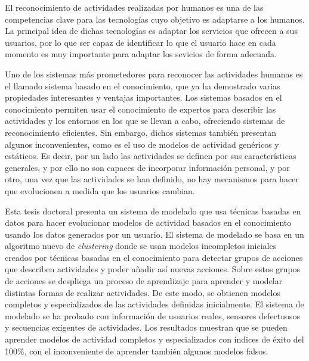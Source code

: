 \begin{resumen}        %


El reconocimiento de actividades realizadas por humanos es una de las competencias clave para las tecnologías cuyo objetivo es adaptarse a los humanos. La principal idea de dichas tecnologías es adaptar los servicios que ofrecen a sus usuarios, por lo que ser capaz de identificar lo que el usuario hace en cada momento es muy importante para adaptar los sevicios de forma adecuada.

Uno de los sistemas más prometedores para reconocer las actividades humanas es el llamado sistema basado en el conocimiento, que ya ha demostrado varias propiedades interesantes y ventajas importantes. Los sistemas basados en el conocimiento permiten usar el conocimiento de expertos para describir las actividades y los entornos en los que se llevan a cabo, ofreciendo sistemas de reconocimiento eficientes. Sin embargo, dichos sistemas también presentan algunos inconvenientes, como es el uso de modelos de actividad genéricos y estáticos. Es decir, por un lado las actividades se definen por sus características generales, y por ello no son capaces de incorporar información personal, y por otro, una vez que las actividades se han definido, no hay mecanismos para hacer que evolucionen a medida que los usuarios cambian.

Esta tesis doctoral presenta un sistema de modelado que usa técnicas basadas en datos para hacer evolucionar modelos de actividad basados en el conocimiento usando los datos generados por un usuario. El sistema de modelado se basa en un algoritmo nuevo de \textit{clustering} donde se usan modelos incompletos iniciales creados por técnicas basadas en el conocimiento para detectar grupos de acciones que describen actividades y poder añadir así nuevas acciones. Sobre estos grupos de acciones se despliega un proceso de aprendizaje para aprender y modelar distintas formas de realizar actividades. De este modo, se obtienen modelos completos y especializados de las actividades definidas inicialmente. El sistema de modelado se ha probado con información de usuarios reales, sensores defectuosos y secuencias exigentes de actividades. Los resultados muestran que se pueden aprender modelos de actividad completos y especializados con índices de éxito del 100\%, con el inconveniente de aprender también algunos modelos falsos.


\end{resumen}

